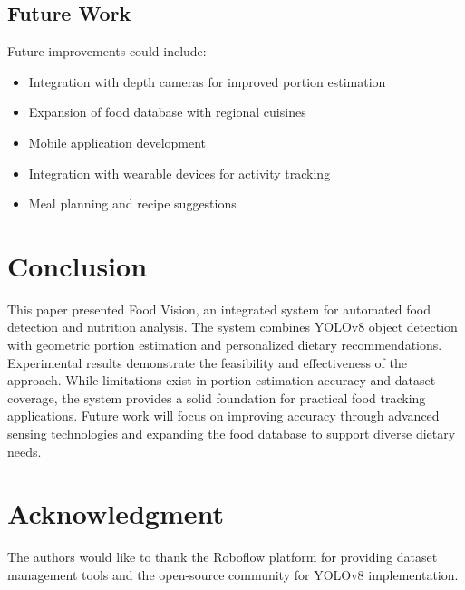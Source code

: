 \documentclass[conference]{IEEEtran}
\begin{document}
\subsection{Future Work}
Future improvements could include:
\begin{itemize}
    \item Integration with depth cameras for improved portion estimation
    \item Expansion of food database with regional cuisines
    \item Mobile application development
    \item Integration with wearable devices for activity tracking
    \item Meal planning and recipe suggestions
\end{itemize}

\section{Conclusion}
This paper presented Food Vision, an integrated system for automated food detection and nutrition analysis. The system combines YOLOv8 object detection with geometric portion estimation and personalized dietary recommendations. Experimental results demonstrate the feasibility and effectiveness of the approach. While limitations exist in portion estimation accuracy and dataset coverage, the system provides a solid foundation for practical food tracking applications. Future work will focus on improving accuracy through advanced sensing technologies and expanding the food database to support diverse dietary needs.

\section*{Acknowledgment}
The authors would like to thank the Roboflow platform for providing dataset management tools and the open-source community for YOLOv8 implementation.
\end{document}
